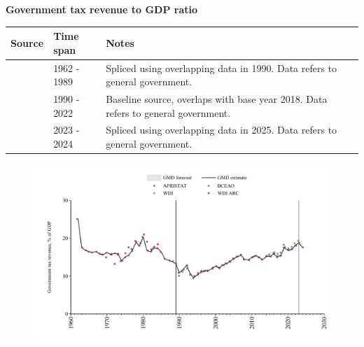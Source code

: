 \documentclass[12pt,a4paper,landscape]{article}
\begin{document}
\begin{adjustbox}{max totalsize={\paperwidth}{\paperheight},center}
\begin{minipage}[t][\textheight][t]{\textwidth}
\vspace*{0.5cm}
{}
\begin{center}
{\Large\bfseries Government tax revenue to GDP ratio}
\end{center}
\vspace{0.5cm}
\begin{table}[H]
\centering
\small
\begin{tabular}{|l|l|l|}
\hline
\textbf{Source} & \textbf{Time span} & \textbf{Notes} \\
\hline
\rowcolor{white}\cite{BCEAO}& 1962 - 1989 &Spliced using overlapping data in 1990. Data refers to general government.\\
\rowcolor{lightgray}\cite{AFRISTAT}& 1990 - 2022 &Baseline source, overlaps with base year 2018. Data refers to general government.\\
\rowcolor{white}\cite{BCEAO}& 2023 - 2024 &Spliced using overlapping data in 2025. Data refers to general government.\\
\hline
\end{tabular}
\end{table}
\begin{figure}[H]
\centering
\includegraphics[width=\textwidth,height=0.6\textheight,keepaspectratio]{graphs/SEN_govtax_GDP.pdf}
\end{figure}
\end{minipage}
\end{adjustbox}
\end{document}
